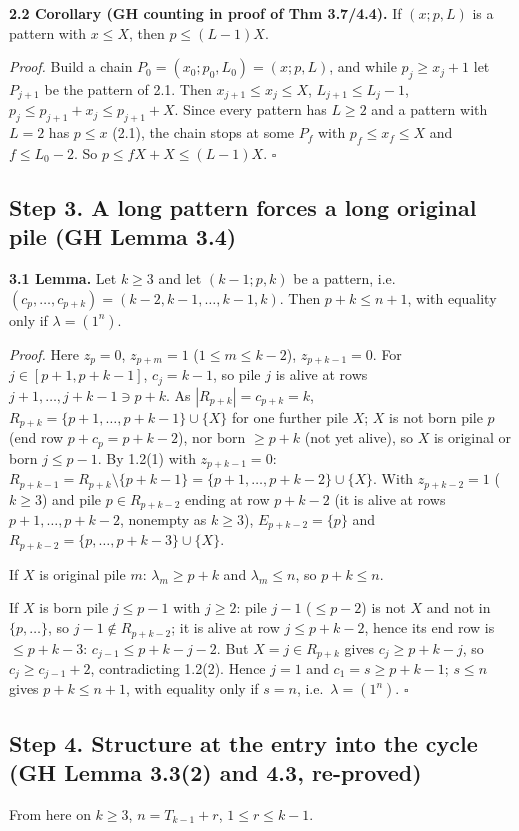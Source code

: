 \documentclass[11pt]{article}
\begin{document}
\textbf{2.2 Corollary (GH counting in proof of Thm 3.7/4.4).} If $(x;p,L)$ is a pattern with $x\le X$, then $p\le(L-1)X$.

\emph{Proof.} Build a chain $P_0=(x_0;p_0,L_0)=(x;p,L)$, and while $p_j\ge x_j+1$ let $P_{j+1}$ be the pattern of 2.1. Then $x_{j+1}\le x_j\le X$, $L_{j+1}\le L_j-1$, $p_j\le p_{j+1}+x_j\le p_{j+1}+X$. Since every pattern has $L\ge2$ and a pattern with $L=2$ has $p\le x$ (2.1), the chain stops at some $P_f$ with $p_f\le x_f\le X$ and $f\le L_0-2$. So $p\le fX+X\le(L-1)X$. $\square$

\subsection*{Step 3. A long pattern forces a long original pile (GH Lemma 3.4)}

\textbf{3.1 Lemma.} Let $k\ge3$ and let $(k-1;p,k)$ be a pattern, i.e.\ $(c_p,\dots,c_{p+k})=(k-2,k-1,\dots,k-1,k)$. Then $p+k\le n+1$, with equality only if $\lambda=(1^n)$.

\emph{Proof.} Here $z_p=0$, $z_{p+m}=1$ ($1\le m\le k-2$), $z_{p+k-1}=0$. For $j\in[p+1,p+k-1]$, $c_j=k-1$, so pile $j$ is alive at rows $j+1,\dots,j+k-1\ni p+k$. As $|R_{p+k}|=c_{p+k}=k$, $R_{p+k}=\{p+1,\dots,p+k-1\}\cup\{X\}$ for one further pile $X$; $X$ is not born pile $p$ (end row $p+c_p=p+k-2$), nor born $\ge p+k$ (not yet alive), so $X$ is original or born $j\le p-1$. By 1.2(1) with $z_{p+k-1}=0$: $R_{p+k-1}=R_{p+k}\setminus\{p+k-1\}=\{p+1,\dots,p+k-2\}\cup\{X\}$. With $z_{p+k-2}=1$ ($k\ge3$) and pile $p\in R_{p+k-2}$ ending at row $p+k-2$ (it is alive at rows $p+1,\dots,p+k-2$, nonempty as $k\ge3$), $E_{p+k-2}=\{p\}$ and $R_{p+k-2}=\{p,\dots,p+k-3\}\cup\{X\}$.

If $X$ is original pile $m$: $\lambda_m\ge p+k$ and $\lambda_m\le n$, so $p+k\le n$.

If $X$ is born pile $j\le p-1$ with $j\ge2$: pile $j-1$ ($\le p-2$) is not $X$ and not in $\{p,\dots\}$, so $j-1\notin R_{p+k-2}$; it is alive at row $j\le p+k-2$, hence its end row is $\le p+k-3$: $c_{j-1}\le p+k-j-2$. But $X=j\in R_{p+k}$ gives $c_j\ge p+k-j$, so $c_j\ge c_{j-1}+2$, contradicting 1.2(2). Hence $j=1$ and $c_1=s\ge p+k-1$; $s\le n$ gives $p+k\le n+1$, with equality only if $s=n$, i.e.\ $\lambda=(1^n)$. $\square$

\subsection*{Step 4. Structure at the entry into the cycle (GH Lemma 3.3(2) and 4.3, re-proved)}
From here on $k\ge3$, $n=T_{k-1}+r$, $1\le r\le k-1$.
\end{document}
